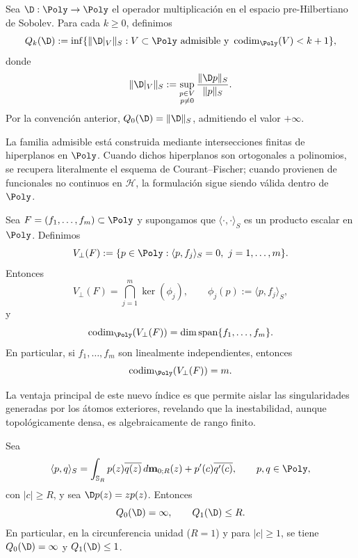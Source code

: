 \begin{defn}\label{def:indice_Qk}
	Sea $\D:\Poly\to\Poly$ el operador multiplicación en el espacio pre-Hilbertiano de Sobolev. Para cada $k\ge0$, definimos
	\[
		Q_k(\D)
		:=\inf\{\|\D|_V\|_S:V\subset\Poly\ \text{admisible y}\ \operatorname{codim}_{\Poly}(V)<k+1\},
	\]
	donde
	\[
		\|\D|_V\|_S:=\sup_{\substack{p\in V\\p\ne0}}\frac{\|\D p\|_S}{\|p\|_S}.
	\]
	Por la convención anterior, $Q_0(\D)=\|\D\|_S$, admitiendo el valor $+\infty$.
\end{defn}

\begin{rmk}
	La familia admisible está construida mediante intersecciones finitas de hiperplanos en $\Poly$. Cuando dichos hiperplanos son ortogonales a polinomios, se recupera literalmente el esquema de Courant--Fischer; cuando provienen de funcionales no continuos en $\mathcal{H}$, la formulación sigue siendo válida dentro de $\Poly$.
\end{rmk}

\begin{prop}\label{prop:equiv_ortho_interseccion}
	Sea $F=(f_1,\dots,f_m)\subset \Poly$ y supongamos que
	$\langle\cdot,\cdot\rangle_S$ es un producto escalar en $\Poly$.
	Definimos
	\[
		V_{\perp}(F):=\{p\in\Poly:\langle p,f_j\rangle_S=0,\ j=1,\dots,m\}.
	\]
	Entonces
	\[
		V_{\perp}(F)=\bigcap_{j=1}^m \ker(\phi_j),
		\qquad
		\phi_j(p):=\langle p,f_j\rangle_S,
	\]
	y
	\[
		\operatorname{codim}_{\Poly}(V_\perp(F))
		=
		\dim\operatorname{span}\{f_1,\dots,f_m\}.
	\]
	En particular, si $f_1,\dots,f_m$ son linealmente independientes, entonces
	\[
		\operatorname{codim}_{\Poly}(V_\perp(F))=m.
	\]
\end{prop}

La ventaja principal de este nuevo índice es que permite aislar las singularidades generadas por los átomos exteriores, revelando que la inestabilidad, aunque topológicamente densa, es algebraicamente de rango finito.

\begin{prop}
	\label{prop:lebesgue_pre_umbral_Qk}
	Sea
	\[
		\langle p,q\rangle_S
		=
		\int_{\mathbb{S}_R} p(z)\overline{q(z)}\,d\mathbf m_{0;R}(z)
		+
		p'(c)\overline{q'(c)},
		\qquad p,q\in\Poly,
	\]
	con $|c|\ge R$, y sea $\D p(z)=zp(z)$. Entonces
	\[
		Q_0(\D)=\infty,
		\qquad
		Q_1(\D)\le R.
	\]
	En particular, en la circunferencia unidad ($R=1$) y para $|c|\ge1$, se tiene
	$Q_0(\D)=\infty$ y $Q_1(\D)\le1$.
\end{prop}

